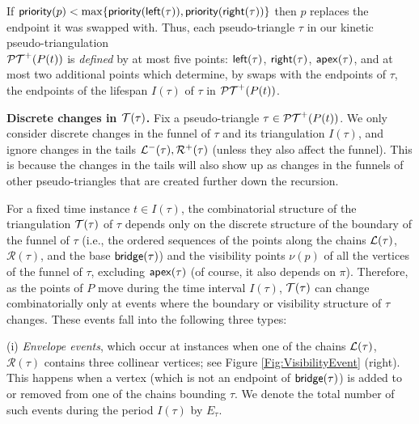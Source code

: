 \documentclass[11pt]{article}
\def\bridge{{\sf bridge}}
\def\PT{{\cal PT}}
\def\T{{\cal T}}
\def\prior{{\sf priority}}
\def\L{{\cal L}}
\def\R{\mathcal{R}}
\def\Left{{\sf left}}
\def\Right{{\sf right}}
\def\apex{{\sf apex}}
\begin{document}
If $\prior(p)<\max\{\prior(\Left(\tau)),\prior(\Right(\tau))\}$ then $p$
replaces the endpoint it was swapped with.  Thus, each pseudo-triangle
$\tau$ in our kinetic pseudo-triangulation\\ $\PT^+(P(t))$ is
\textit{defined} by at most five points:
$\Left(\tau)$, $\Right(\tau)$, $\apex(\tau)$, and at most two additional
points which determine, by swaps with the endpoints of $\tau$, the
endpoints of the lifespan $I(\tau)$ of $\tau$ in $\PT^+(P(t))$.

\medskip
\noindent
{\bf Discrete changes in $\T(\tau)$.}
Fix a pseudo-triangle $\tau\in \PT^+(P(t))$. 
We only consider discrete changes in the funnel of $\tau$ and its triangulation $I(\tau)$, and ignore changes in the tails $\L^-(\tau), \R^+(\tau)$ (unless they also affect the funnel). This is because the changes in the tails will also show up as changes in the funnels of other pseudo-triangles that are created further down the recursion.

For a fixed time instance
$t\in I(\tau)$, the combinatorial structure of the triangulation
$\T(\tau)$ of $\tau$ depends only on the discrete structure of the
boundary of the funnel of $\tau$ (i.e., the ordered sequences of the
points along the chains $\L(\tau)$, $\R(\tau)$, and the base
$\bridge(\tau)$) and the visibility points $\nu(p)$ of all the
vertices of the funnel of $\tau$, excluding $\apex(\tau)$ (of course, it also depends on $\pi$).
Therefore, as the points of $P$ move during the time interval
$I(\tau)$, $\T(\tau)$ can change combinatorially only at events where the boundary
or visibility structure of $\tau$ changes. These events fall into the
following three types:

(i) \textit{Envelope events}, which occur at instances when one of the
chains $\L(\tau)$, $\R(\tau)$ contains three collinear vertices; see
Figure \ref{Fig:VisibilityEvent} (right).  This happens when a vertex
(which is not an endpoint of $\bridge(\tau)$) is added to or removed
from one of the chains bounding $\tau$.  We denote the total number of
such events during the period $I(\tau)$ by $E_\tau$.
\end{document}
